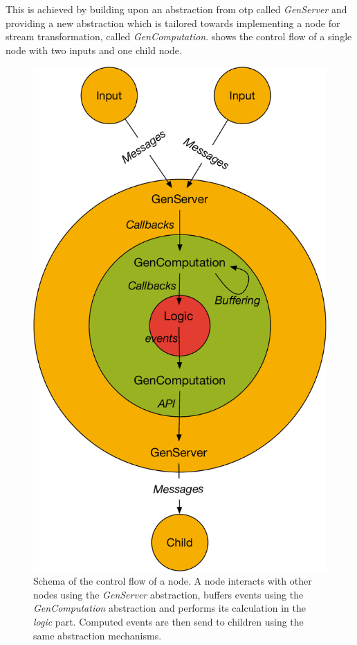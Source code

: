 This is achieved by building upon an abstraction from \gls{otp} called \emph{GenServer} and providing a new abstraction which is tailored towards implementing a node for stream transformation, called \emph{GenComputation}.
 shows the control flow of a single node with two inputs and one child node.

\begin{figure}
  \center
  \includegraphics[width=\textwidth,height=0.9\textheight,keepaspectratio]{content/figs/node_architecture}
  \caption[Control flow of a node]{Schema of the control flow of a node. A node interacts with other nodes using the \emph{GenServer} abstraction, buffers events using the \emph{GenComputation} abstraction and performs its calculation in the \emph{logic} part. Computed events are then send to children using the same abstraction mechanisms.}
\label{fig:chap6:sec_node_impl:node_control_flow}
\end{figure}

